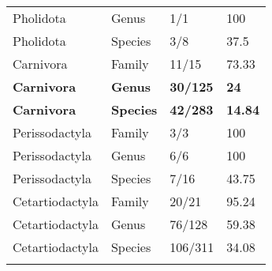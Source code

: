 \begin{longtable}{llll}
  Pholidota & Genus & 1/1 & 100 \\ 
  Pholidota & Species & 3/8 & 37.5 \\ 
  Carnivora & Family & 11/15 & 73.33 \\ 
  \textbf{Carnivora} & \textbf{Genus} & \textbf{30/125} & \textbf{24} \\ 
  \textbf{Carnivora} & \textbf{Species} & \textbf{42/283} & \textbf{14.84} \\ 
  Perissodactyla & Family & 3/3 & 100 \\ 
  Perissodactyla & Genus & 6/6 & 100 \\ 
  Perissodactyla & Species & 7/16 & 43.75 \\ 
  Cetartiodactyla & Family & 20/21 & 95.24 \\ 
  Cetartiodactyla & Genus & 76/128 & 59.38 \\ 
  Cetartiodactyla & Species & 106/311 & 34.08 \\ 
   \hline
\hline
\label{Table_morpho_taxa_proportion}
\end{longtable}
